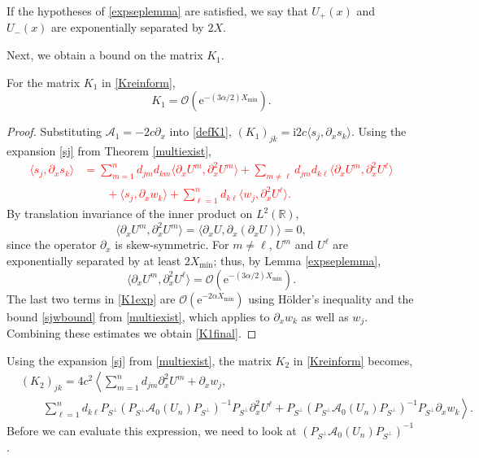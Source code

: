 \documentclass[review,onefignum,onetabnum]{siamart171218}
\newcommand{\R}{\mathbb{R}}
\newcommand{\rme}{\mathrm{e}}
\newcommand{\rmi}{\mathrm{i}}
\newcommand{\calA}{\mathcal{A}}
\newcommand{\vK}{\bm{\mathit{K}}}
\newcommand{\revised}[1]{ \textcolor{red}{#1} }
\begin{document}
\begin{remark}
If the hypotheses of \cref{expseplemma} are satisfied, we say that $U_+(x)$ and $U_-(x)$ are exponentially separated by $2X$.
\end{remark}

Next, we obtain a bound on the matrix $\vK_1$.
\begin{lemma}\label{K1small}
For the matrix $\vK_1$ in \cref{Kreinform},
\begin{equation}\label{K1final}
\vK_1 = \mathcal{O}(\rme^{-(3 \alpha/2) X_{\mathrm{min}}}).
\end{equation}
\end{lemma}

\begin{proof}
Substituting $\calA_1 = -2c\partial_x$ into \cref{defK1}, $(\vK_1)_{jk} = \rmi 2 c \langle s_j, \partial_xs_k \rangle$. Using the expansion \cref{sj} from Theorem \ref{multiexist},
\revised{
\begin{equation}\label{K1exp}
\begin{aligned}
\langle s_j ,\partial_xs_k \rangle
&= \sum_{m = 1}^{n} d_{jm} d_{km} \langle \partial_xU^m, \partial_x^2U^m \rangle
+ \sum_{m \neq\ell} d_{jm} d_{k\ell} \langle \partial_xU^m, \partial_x^2U^\ell \rangle\\
&\qquad
+ \langle s_j, \partial_x w_k \rangle
+ \sum_{\ell = 1}^{n} d_{k\ell} \langle w_j, \partial_x^2U^\ell \rangle.
\end{aligned}
\end{equation}
}
By translation invariance of the inner product on $L^2(\R)$,
\[
\langle \partial_xU^m, \partial_x^2U^m \rangle = \langle \partial_xU, \partial_x(\partial_xU) \rangle = 0,
\]
since the operator $\partial_x$ is skew-symmetric. For $m \neq\ell$, $U^m$ and $U^\ell$ are exponentially separated by at least $2 X_{\mathrm{min}}$; thus, by Lemma \ref{expseplemma},
\[
\langle \partial_xU^m, \partial_x^2U^\ell \rangle = \mathcal{O}(\rme^{-(3 \alpha/2) X_{\mathrm{min}}}).
\]
The last two terms in \cref{K1exp} are $\mathcal{O}(\rme^{-2 \alpha X_{\mathrm{min}}})$ using H\"{o}lder's inequality and the bound \cref{sjwbound} from \cref{multiexist}, which applies to $\partial_x w_k$ as well as $w_j$. Combining these estimates we obtain \cref{K1final}.
\end{proof}

Using the expansion \cref{sj} from \cref{multiexist}, the matrix $\vK_2$ in \cref{Kreinform} becomes,
\begin{equation}\label{K2expansion}
\begin{aligned}
&(\vK_2)_{jk}
= 4 c^2 \left\langle\sum_{m = 1}^{n} d_{jm} \partial_x^2U^m + \partial_x w_j,\right. \\
&\qquad\left.\sum_{\ell = 1}^{n} d_{k\ell} P_{S^\perp} (P_{S^\perp} \calA_0(U_n)P_{S^\perp})^{-1} P_{S^\perp} \partial_x^2U^\ell + P_{S^\perp} (P_{S^\perp} \calA_0(U_n)P_{S^\perp})^{-1} P_{S^\perp}\partial_xw_k \right\rangle.
\end{aligned}
\end{equation}
Before we can evaluate this expression, we need to look at $(P_{S^\perp} \calA_0(U_n)P_{S^\perp})^{-1}$.
\end{document}
